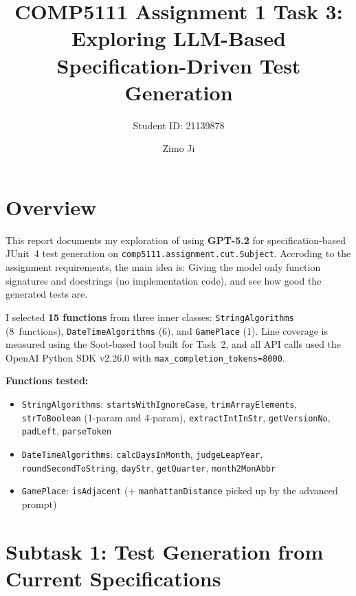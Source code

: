 \documentclass[acmsmall,nonacm]{acmart}
\title{COMP5111 Assignment 1 Task 3: Exploring LLM-Based Specification-Driven Test Generation}
\subtitle{Student ID: 21139878}
\author{Zimo Ji}
\affiliation{%
  \institution{Hong Kong University of Science and Technology}
  \country{Hong Kong SAR, China}
}
\begin{document}
\maketitle

\tableofcontents
\newpage

\section{Overview}

This report documents my exploration of using \textbf{GPT-5.2} for specification-based JUnit~4
test generation on \texttt{comp5111.assignment.cut.Subject}. Accroding to the  assignment requirements, the main idea is:
Giving the model only function signatures and docstrings (no implementation code), and see how good
the generated tests are.

I selected \textbf{15 functions} from three inner classes: \texttt{StringAlgorithms} (8~functions),
\texttt{DateTimeAlgorithms} (6), and \texttt{GamePlace} (1). Line coverage is measured using the
Soot-based tool built for Task~2, and all API calls used the OpenAI Python SDK v2.26.0 with
\texttt{max\_completion\_tokens=8000}.

\medskip\noindent\textbf{Functions tested:}
\begin{itemize}
  \item \texttt{StringAlgorithms}: \texttt{startsWithIgnoreCase}, \texttt{trimArrayElements},
        \texttt{strToBoolean} (1-param and 4-param),
        \texttt{extractIntInStr}, \texttt{getVersionNo}, \texttt{padLeft}, \texttt{parseToken}
  \item \texttt{DateTimeAlgorithms}: \texttt{calcDaysInMonth}, \texttt{judgeLeapYear},
        \texttt{roundSecondToString}, \texttt{dayStr}, \texttt{getQuarter}, \texttt{month2MonAbbr}
  \item \texttt{GamePlace}: \texttt{isAdjacent} (+ \texttt{manhattanDistance} picked up by the advanced prompt)
\end{itemize}

\section{Subtask 1: Test Generation from Current Specifications}
\end{document}
